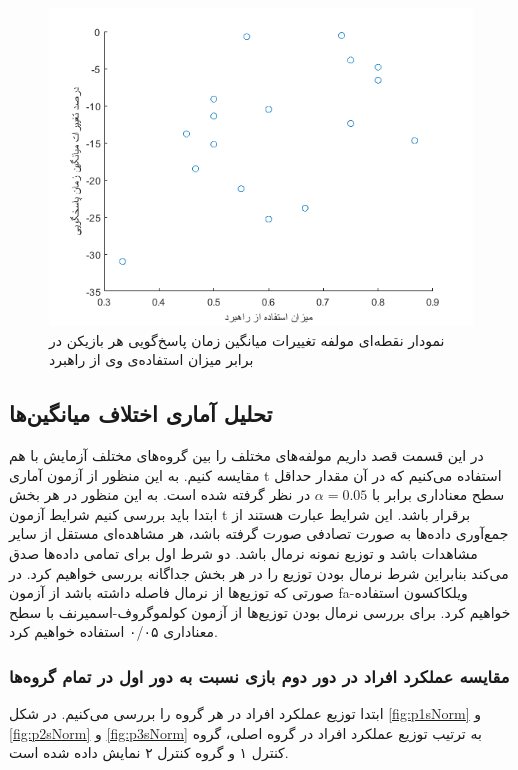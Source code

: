 \documentclass[twoside, a4paper,11pt]{book}
\numberwithin{equation}{chapter}
\numberwithin{table}{chapter}
\numberwithin{figure}{chapter}
\numberwithin{equation}{chapter}
\newcommand{\mls}[1]{\gls{fa-#1}\glsuseri{la-#1}}
\begin{document}
\begin{figure}
\centering
\includegraphics[scale=0.8]{Figures/stUseDtScatter.png}
\caption{\label{fig:stUseDtScatter}
نمودار نقطه‌ای مولفه تغییرات میانگین زمان پاسخ‌گویی هر بازیکن در برابر میزان استفاده‌ی وی از راهبرد
}
\end{figure}



\subsection{تحلیل آماری اختلاف میانگین‌ها}
در این قسمت قصد داریم مولفه‌های مختلف را بین گروه‌های مختلف آزمایش با هم مقایسه کنیم. به این منظور از آزمون آماری t  استفاده می‌کنیم که در آن مقدار حداقل سطح معناداری برابر با  $\alpha = 0.05$ در نظر گرفته شده است. به این منظور در هر بخش ابتدا باید بررسی کنیم شرایط آزمون t برقرار باشد. این شرایط عبارت هستند از جمع‌آوری داده‌ها به صورت تصادفی صورت گرفته باشد، هر مشاهده‌ای مستقل از سایر مشاهدات باشد و توزیع نمونه نرمال باشد. دو شرط اول برای تمامی داده‌ها صدق می‌کند بنابراین شرط نرمال بودن توزیع را در هر بخش جداگانه بررسی خواهیم کرد. در صورتی که توزیع‌ها از نرمال فاصله داشته باشد از آزمون \mls{ویلکاکسون} استفاده خواهیم کرد. برای بررسی نرمال بودن توزیع‌ها از آزمون کولموگروف-اسمیرنف با سطح معناداری ۰/۰۵ استفاده خواهیم کرد.

\subsubsection{مقایسه عملکرد افراد در دور دوم بازی نسبت به دور اول در تمام گروه‌ها}

ابتدا توزیع عملکرد افراد در هر گروه را بررسی می‌کنیم. در شکل \ref{fig:p1sNorm} و \ref{fig:p2sNorm} و \ref{fig:p3sNorm} به ترتیب توزیع عملکرد افراد در گروه اصلی، گروه کنترل ۱ و گروه کنترل ۲ نمایش داده شده است.
\end{document}
